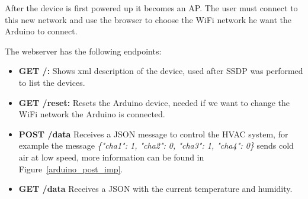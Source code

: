 After the device is first powered up it becomes an \ac{AP}. The user must connect to this new network and use the browser to choose the \ac{WiFi} network he want the Arduino to connect.


The webserver has the following endpoints:


\begin{itemize}
  \item \textbf{GET /:} Shows xml description of the device, used after \ac{SSDP} was performed to list the devices.
  \item \textbf{GET /reset:} Resets the Arduino device, needed if we want to change the WiFi network the Arduino is connected.
  \item \textbf{POST /data} Receives a JSON message to control the HVAC system, for example the message \textit{\{"cha1": 1, "cha2": 0, "cha3": 1, "cha4": 0\}} sends cold air at low speed, more information can be found in Figure~\ref{arduino_post_imp}.
  
  \item \textbf{GET /data} Receives a JSON with the current temperature and humidity.
 
\end{itemize}




